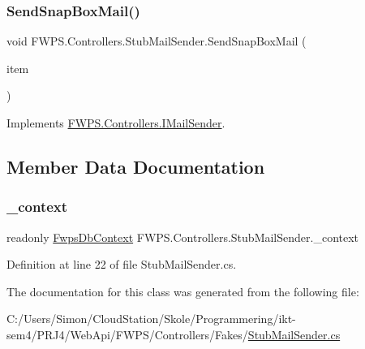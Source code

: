 \subsubsection{\texorpdfstring{Send\+Snap\+Box\+Mail()}{SendSnapBoxMail()}}
{\footnotesize\ttfamily void F\+W\+P\+S.\+Controllers.\+Stub\+Mail\+Sender.\+Send\+Snap\+Box\+Mail (\begin{DoxyParamCaption}\item[{\mbox{\hyperlink{class_f_w_p_s_1_1_models_1_1_snap_box_item}{Snap\+Box\+Item}}}]{item }\end{DoxyParamCaption})}



Implements \mbox{\hyperlink{interface_f_w_p_s_1_1_controllers_1_1_i_mail_sender_a5d2d15273d1baa5c01bbe32db73d65a8}{F\+W\+P\+S.\+Controllers.\+I\+Mail\+Sender}}.



\subsection{Member Data Documentation}
\mbox{\label{class_f_w_p_s_1_1_controllers_1_1_stub_mail_sender_a81ac7a4adde6f0c16a9a111cc358d1bd}} 
\subsubsection{\texorpdfstring{\+\_\+context}{\_context}}
{\footnotesize\ttfamily readonly \mbox{\hyperlink{class_f_w_p_s_1_1_data_1_1_fwps_db_context}{Fwps\+Db\+Context}} F\+W\+P\+S.\+Controllers.\+Stub\+Mail\+Sender.\+\_\+context\hspace{0.3cm}{\ttfamily [private]}}



Definition at line 22 of file Stub\+Mail\+Sender.\+cs.



The documentation for this class was generated from the following file\+:\begin{DoxyCompactItemize}
\item 
C\+:/\+Users/\+Simon/\+Cloud\+Station/\+Skole/\+Programmering/ikt-\/sem4/\+P\+R\+J4/\+Web\+Api/\+F\+W\+P\+S/\+Controllers/\+Fakes/\mbox{\hyperlink{_stub_mail_sender_8cs}{Stub\+Mail\+Sender.\+cs}}\end{DoxyCompactItemize}
